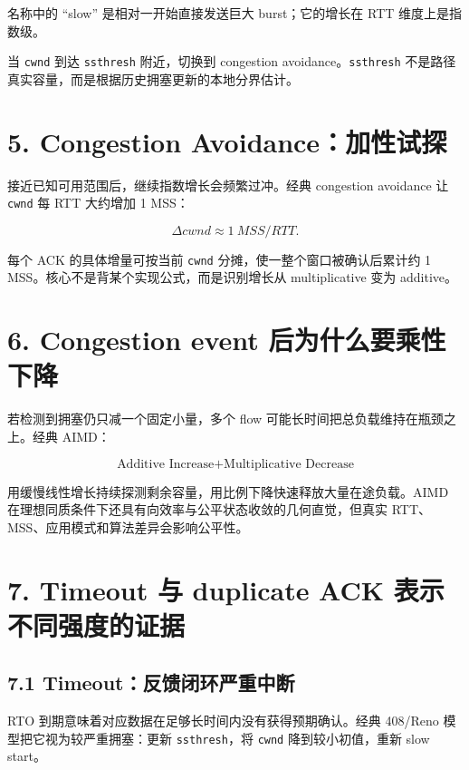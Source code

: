 \documentclass[UTF8,fontset=none,11pt,a4paper]{ctexart}
\providecommand{\passthrough}[1]{#1}
\begin{document}
名称中的 ``slow'' 是相对一开始直接发送巨大 burst；它的增长在 RTT
维度上是指数级。

当 \passthrough{\lstinline!cwnd!} 到达
\passthrough{\lstinline!ssthresh!} 附近，切换到 congestion
avoidance。\passthrough{\lstinline!ssthresh!}
不是路径真实容量，而是根据历史拥塞更新的本地分界估计。

\section{5. Congestion
Avoidance：加性试探}\label{5-congestion-avoidanceux52a0ux6027ux8bd5ux63a2}

接近已知可用范围后，继续指数增长会频繁过冲。经典 congestion avoidance 让
\passthrough{\lstinline!cwnd!} 每 RTT 大约增加 1 MSS：

\[
\Delta cwnd\approx 1\ MSS/RTT.
\]

每个 ACK 的具体增量可按当前 \passthrough{\lstinline!cwnd!}
分摊，使一整个窗口被确认后累计约 1
MSS。核心不是背某个实现公式，而是识别增长从 multiplicative 变为
additive。

\section{6. Congestion event
后为什么要乘性下降}\label{6-congestion-event-ux540eux4e3aux4ec0ux4e48ux8981ux4e58ux6027ux4e0bux964d}

若检测到拥塞仍只减一个固定小量，多个 flow
可能长时间把总负载维持在瓶颈之上。经典 AIMD：

\[
\boxed{\text{Additive Increase} + \text{Multiplicative Decrease}}
\]

用缓慢线性增长持续探测剩余容量，用比例下降快速释放大量在途负载。AIMD
在理想同质条件下还具有向效率与公平状态收敛的几何直觉，但真实
RTT、MSS、应用模式和算法差异会影响公平性。

\section{7. Timeout 与 duplicate ACK
表示不同强度的证据}\label{7-timeout-ux4e0e-duplicate-ack-ux8868ux793aux4e0dux540cux5f3aux5ea6ux7684ux8bc1ux636e}

\subsection{7.1
Timeout：反馈闭环严重中断}\label{71-timeoutux53cdux9988ux95edux73afux4e25ux91cdux4e2dux65ad}

RTO 到期意味着对应数据在足够长时间内没有获得预期确认。经典 408/Reno
模型把它视为较严重拥塞：更新 \passthrough{\lstinline!ssthresh!}，将
\passthrough{\lstinline!cwnd!} 降到较小初值，重新 slow start。
\end{document}
